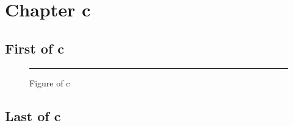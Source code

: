\chapter{Chapter c}
\section{First of c}
\lipsum[1-3]
\begin{figure}[h]\centering\rule{2cm}{1cm}\caption{Figure of c}\end{figure}
\section{Last of c}\label{last-c}
\lipsum[4-6]

